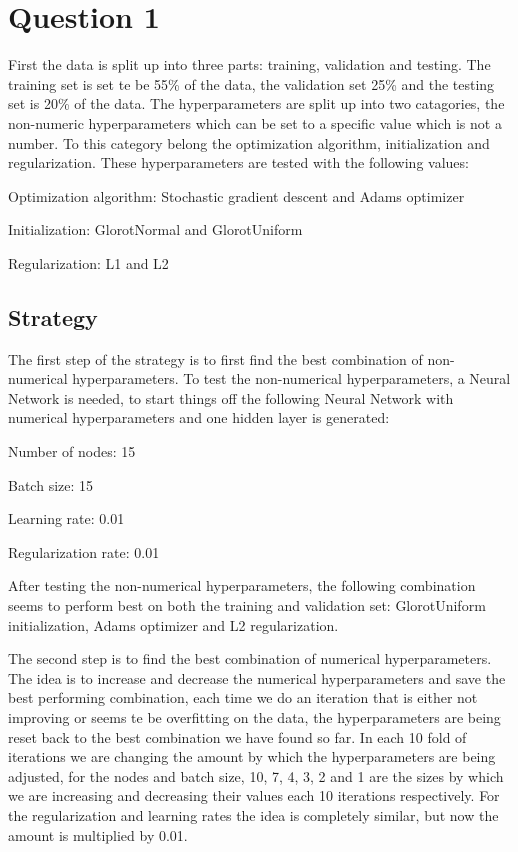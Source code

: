 \section{Question 1}
First the data is split up into three parts: training, validation and testing. The training set is set te be 55\% of the data, the validation set 25\% and the testing set is 20\% of the data. 
The hyperparameters are split up into two catagories, the non-numeric hyperparameters which can be set to a specific value which is not a number. To this category belong the optimization algorithm, initialization and regularization. These hyperparameters are tested with the following values:
\begin{description}
	\item Optimization algorithm: Stochastic gradient descent and Adams optimizer
	\item Initialization: GlorotNormal and GlorotUniform
	\item Regularization: L1 and L2
\end{description}
\subsection*{Strategy}
The first step of the strategy is to first find the best combination of non-numerical hyperparameters. To test the non-numerical hyperparameters, a Neural Network is needed, to start things off the following Neural Network with numerical hyperparameters and one hidden layer is generated:
\begin{description}
	\item Number of nodes: 15  
	\item Batch size: 15
	\item Learning rate: 0.01
	\item Regularization rate: 0.01
\end{description}
After testing the non-numerical hyperparameters, the following combination seems to perform best on both the training and validation set: GlorotUniform initialization, Adams optimizer and L2 regularization.

The second step is to find the best combination of numerical hyperparameters. The idea is to increase and decrease the numerical hyperparameters and save the best performing combination, each time we do an iteration that is either not improving or seems te be overfitting on the data, the hyperparameters are being reset back to the best combination we have found so far. In each 10 fold of iterations we are changing the amount by which the hyperparameters are being adjusted, for the nodes and batch size, 10, 7, 4, 3, 2 and 1 are the sizes by which we are increasing and decreasing their values each 10 iterations respectively. For the regularization and learning rates the idea is completely similar, but now the amount is multiplied by 0.01. 

